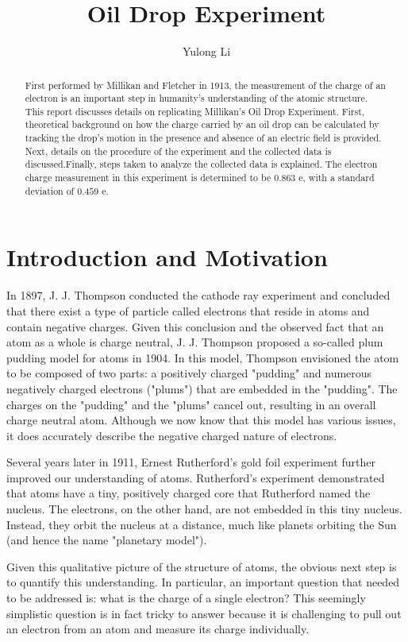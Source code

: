 \documentclass{article}
\title{Oil Drop Experiment}
\author{Yulong Li}
\begin{document}
\maketitle

\begin{abstract}
First performed by Millikan and Fletcher in 1913, the measurement of the charge of an electron is an important step in humanity's understanding of the atomic structure. This report discusses details on replicating Millikan's Oil Drop Experiment. First, theoretical background on how the charge carried by an oil drop can be calculated by tracking the drop's motion in the presence and absence of an electric field is provided.  Next, details on the procedure of the experiment and the collected data is discussed.Finally, steps taken to analyze the collected data is explained. The electron charge measurement in this experiment is determined to be $0.863$ e, with a standard deviation of $0.459$ e.

\end{abstract}

\section{Introduction and Motivation}
In 1897, J. J. Thompson conducted the cathode ray experiment and concluded that there exist a type of particle called electrons that reside in atoms and contain negative charges. Given this conclusion and the observed fact that an atom as a whole is charge neutral, J. J. Thompson proposed a so-called plum pudding model for atoms in 1904. In this model, Thompson envisioned the atom to be composed of two parts: a positively charged "pudding" and numerous negatively charged electrons ("plums") that are embedded in the "pudding". The charges on the "pudding" and the "plums" cancel out, resulting in an overall charge neutral atom. Although we now know that this model has various issues, it does accurately describe the negative charged nature of electrons.

Several years later in 1911, Ernest Rutherford's gold foil experiment further improved our understanding of atoms. Rutherford's experiment demonstrated that atoms have a tiny, positively charged core that Rutherford named the nucleus. The electrons, on the other hand, are not embedded in this tiny nucleus. Instead, they orbit the nucleus at a distance, much like planets orbiting the Sun (and hence the name "planetary model"). 

Given this qualitative picture of the structure of atoms, the obvious next step is to quantify this understanding. In particular, an important question that needed to be addressed is: what is the charge of a single electron? This seemingly simplistic question is in fact tricky to answer because it is challenging to pull out an electron from an atom and measure its charge individually. 
\end{document}
